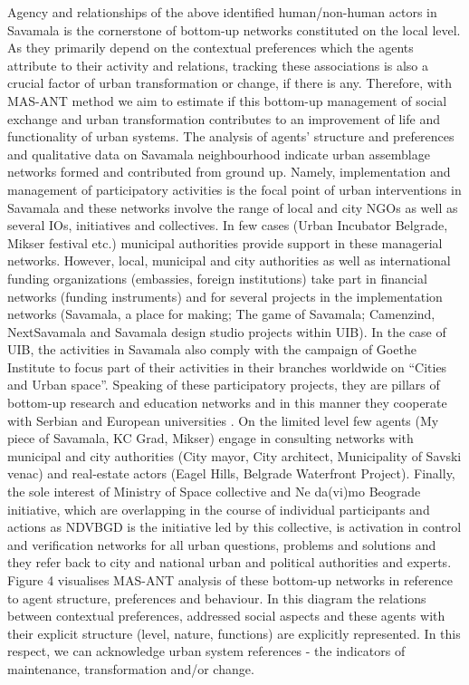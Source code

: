\documentclass[11pt]{report}
\begin{document}
Agency and relationships of the above identified human/non-human actors in Savamala is the cornerstone of bottom-up networks constituted on the local level. As they primarily depend on the contextual preferences which the agents attribute to their activity and relations, tracking these associations is also a crucial factor of urban transformation or change, if there is any. Therefore, with MAS-ANT method we aim to estimate if this bottom-up management of social exchange and urban transformation contributes to an improvement of life and functionality of urban systems.
The analysis of agents’ structure and preferences and qualitative data on Savamala neighbourhood indicate urban assemblage networks formed and contributed from ground up. Namely, implementation and management of participatory activities is the focal point of urban interventions in Savamala and these networks involve the range of local and city NGOs as well as several IOs, initiatives and collectives. In few cases (Urban Incubator Belgrade, Mikser festival etc.) municipal authorities provide support in these managerial networks. However, local, municipal and city authorities as well as international funding organizations (embassies, foreign institutions) take part in financial networks (funding instruments) and for several projects in the implementation networks (Savamala, a place for making; The game of Savamala; Camenzind, NextSavamala and Savamala design studio projects within UIB). In the case of UIB, the activities in Savamala also comply with the campaign of Goethe Institute to focus part of their activities in their branches worldwide on “Cities and Urban space”. Speaking of these participatory projects, they are pillars of bottom-up research and education networks and in this manner they cooperate with Serbian and European universities . On the limited level few agents (My piece of Savamala, KC Grad, Mikser) engage in consulting networks with municipal and city authorities (City mayor, City architect, Municipality of Savski venac) and real-estate actors (Eagel Hills, Belgrade Waterfront Project). Finally, the sole interest of Ministry of Space collective and Ne da(vi)mo Beograde initiative, which are overlapping in the course of individual participants and actions as NDVBGD is the initiative led by this collective, is activation in control and verification networks for all urban questions, problems and solutions and they refer back to city and national urban and political authorities and experts.
Figure 4 visualises MAS-ANT analysis of these bottom-up networks in reference to agent structure, preferences and behaviour. In this diagram the relations between contextual preferences, addressed social aspects and these agents with their explicit structure (level, nature, functions) are explicitly represented. In this respect, we can acknowledge urban system references - the indicators of maintenance, transformation and/or change.
\end{document}
